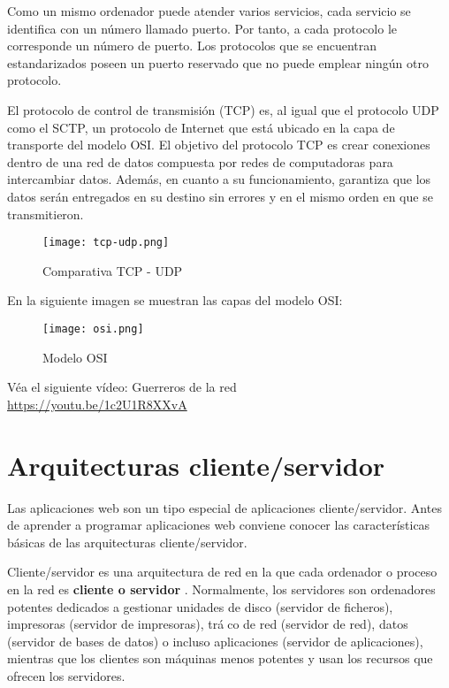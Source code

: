 Como un mismo ordenador puede atender varios servicios, cada servicio se identifica con un número llamado puerto. Por tanto, a cada protocolo le corresponde un
número de puerto. Los protocolos que se encuentran estandarizados poseen un puerto
reservado que no puede emplear ningún otro protocolo.

\cite{wiki}El protocolo de control de transmisión (TCP) es, al igual que el protocolo UDP como el SCTP, un protocolo de Internet que está ubicado en la capa de transporte del modelo OSI. El objetivo del protocolo TCP es crear conexiones dentro de una red de datos compuesta por redes de computadoras para intercambiar datos. Además, en cuanto a su funcionamiento, garantiza que los datos serán entregados en su destino sin errores y en el mismo orden en que se transmitieron.

\begin{figure}[H]
	\center
	\texttt{[image: tcp-udp.png]}
	\caption{Comparativa TCP - UDP}
	\label{fig:super}
\end{figure}

\cite{osi}En la siguiente imagen se muestran las capas del modelo OSI:

\begin{figure}[H]
	\center
	\texttt{[image: osi.png]}
	\caption{Modelo OSI}
	\label{fig:super}
\end{figure}

\begin{remark}
Véa el siguiente vídeo: Guerreros de la red \\
\url{https://youtu.be/1c2U1R8XXvA}
\end{remark}

\section{Arquitecturas cliente/servidor} 

\cite{sl}Las aplicaciones web son un tipo especial de aplicaciones cliente/servidor. Antes de
aprender a programar aplicaciones web conviene conocer las características básicas de las
arquitecturas cliente/servidor.

Cliente/servidor es una arquitectura de red
en la que cada ordenador o proceso en
la red es \textbf{cliente o servidor}
. Normalmente, los servidores son ordenadores potentes
dedicados a gestionar unidades de disco (servidor de ficheros), impresoras (servidor de impresoras), tráco de red (servidor de red), datos (servidor de bases de datos) o
incluso aplicaciones (servidor de aplicaciones), mientras que los clientes son máquinas
menos potentes y usan los recursos que ofrecen los servidores.

